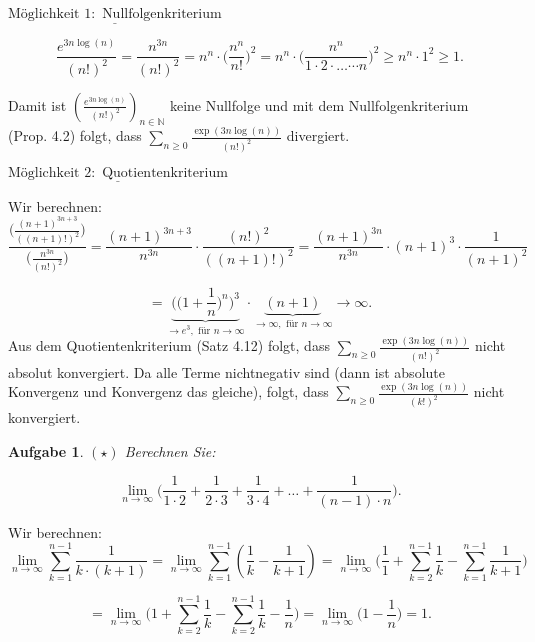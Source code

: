 \documentclass[a4paper, 20]{exam}
\newtheorem{ex}{Aufgabe}
\newcommand\NN{\mathbb{N}}
\begin{document}
\begin{solution}
\begin{enumerate}[i.)]
$\underline{\text{M\"oglichkeit }1: \text{ Nullfolgenkriterium}}$ 

$$\frac{e^{3n \log(n)}}{(n!)^2}= \frac{n^{3n}}{(n!)^2}
= n^n \cdot \bigg(\frac{n^n}{n!}\bigg)^2 
= n^n \cdot \bigg(\frac{n^n}{1 \cdot 2 \cdot \dots \cdots n}\bigg)^2
\geq n^n \cdot 1^2 \geq 1.$$

Damit ist $(\frac{e^{3n \log(n)}}{(n!)^2})_{n \in \NN}$ keine Nullfolge und mit dem Nullfolgenkriterium (Prop. 4.2) folgt, dass $\sum_{n\geq 0} \frac{\exp(3n \log(n))}{(n!)^2}$ divergiert.

$\underline{\text{M\"oglichkeit }2: \text{ Quotientenkriterium}}$

Wir berechnen:
$$ \frac{\bigg(\frac{(n+1)^{3n+3}}{((n+1)!)^2} \bigg)}{\bigg(\frac{n^{3n}}{(n!)^2} \bigg)} 
= \frac{(n+1)^{3n+3}}{n^{3n}} \cdot \frac{(n!)^2}{((n+1)!)^2}
= \frac{(n+1)^{3n}}{n^{3n}} \cdot (n+1)^3 \cdot \frac{1}{(n+1)^2}$$

$$=\underbrace{\bigg(\Big( 1+ \frac{1}{n} \Big)^{n}\bigg)^3}_{\longrightarrow e^3, \text{ f\"ur } n\longrightarrow \infty} \cdot \underbrace{(n+1)}_{\longrightarrow \infty, \text{ f\"ur } n \longrightarrow \infty} \longrightarrow \infty.$$
Aus dem Quotientenkriterium (Satz 4.12) folgt, dass $\sum_{n\geq 0} \frac{\exp(3n \log(n))}{(n!)^2}$ nicht absolut konvergiert. Da alle Terme nichtnegativ sind (dann ist absolute Konvergenz und Konvergenz das gleiche), folgt, dass $\sum_{n\geq 0} \frac{\exp(3n \log(n))}{(k!)^2}$ nicht konvergiert.
\end{enumerate}
\end{solution}


\begin{ex}{$(\star)$}
Berechnen Sie:

$$ \lim_{n \rightarrow \infty} \bigg( \frac{1}{1\cdot 2} + \frac{1}{2\cdot 3} + \frac{1}{3 \cdot 4} + \dots + \frac{1}{(n-1)\cdot n} \bigg).$$
\end{ex}
\begin{solution}
Wir berechnen:
$$ \lim_{n\rightarrow \infty} \sum_{k=1}^{n-1} \frac{1}{k\cdot (k+1)}
= \lim_{n\rightarrow \infty} \sum_{k=1}^{n-1} \left(\frac{1}{k}- \frac{1}{k+1} \right)
= \lim_{n\rightarrow \infty} \bigg(\frac{1}{1}+ \sum_{k=2}^{n-1} \frac{1}{k} - \sum_{k=1}^{n-1} \frac{1}{k+1}\bigg)$$

$$= \lim_{n\rightarrow \infty} \bigg(1+ \sum_{k=2}^{n-1} \frac{1}{k} - \sum_{k=2}^{n-1} \frac{1}{k} -\frac{1}{n}\bigg)
= \lim_{n\rightarrow \infty} \bigg( 1 - \frac{1}{n} \bigg)= 1.$$
\end{solution}
\end{document}
